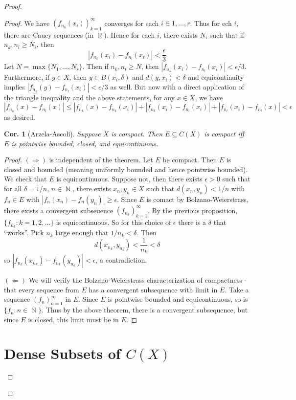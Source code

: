 \documentclass[12pt, a4paper]{book}
\DeclareMathOperator{\N}{\mathbb{N}}
\DeclareMathOperator{\R}{\mathbb{R}}
\newtheorem{corollary}[theorem]{Cor.}
\theoremstyle{nonumberplain}
\newtheorem{proof}{Proof}
\begin{document}
\begin{proof}
\begin{proof}
    We have $(f_{n_k}(x_i))_{k=1}^\infty$ converges for each $i\in 1,\ldots,r$.
    Thus for ech $i$, there are Caucy sequences (in $\R$).
    Hence for each $i$, there exists $N_i$ such that if $n_k,n_l\geq N_i$, then
    \[|f_{n_k}(x_i)-f_{n_l}(x_i)|<\frac{\epsilon}{3}\]
    Let $N=\max\{N_1,\ldots,N_r\}$.
    Then if $n_k,n_l\geq N$, then $|f_{n_k}(x_i)-f_{n_l}(x_i)|<\epsilon/3$.
    Furthermore, if $y\in X$, then $y\in B(x_i,\delta)$ and $d(y,x_i)<\delta$ and equicontinuity implies $|f_{n_k}(y)-f_{n_l}(x_i)|<\epsilon/3$ as well.
    But now with a direct application of the triangle inequality and the above statements, for any $x\in X$, we have
    \[|f_{n_k}(x)-f_{n_l}(x)|\leq |f_{n_k}(x)-f_{n_k}(x_i)|+|f_{n_k}(x_i)-f_{n_l}(x_i)|+|f_{n_l}(x_i)-f_{n_l}(x)|<\epsilon\]
    as desired.
\begin{corollary}[Arzela-Ascoli]
    Suppose $X$ is compact.
    Then $E\subseteq C(X)$ is compact iff $E$ is pointwise bounded, closed, and equicontinuous.
\end{corollary}
\begin{proof}
    $(\Rightarrow)$ is independent of the theorem.
    Let $E$ be compact.
    Then $E$ is closed and bounded (meaning uniformly bounded and hence pointwise bounded).
    We check that $E$ is equicontinuous.
    Suppose not, then there exists $\epsilon>0$ such that for all $\delta=1/n$, $n\in\N$, there exists $x_n,y_n\in X$ such that $d(x_n,y_n)<1/n$ with $f_n\in E$ with $|f_n(x_n)-f_n(y_n)|\geq\epsilon$.
    Since $E$ is comact by Bolzano-Weierstrass, there exists a convergent subseuence $(f_{n_k})_{k=1}^\infty$.
    By the previous proposition, $\{f_{n_k}:k=1,2,\ldots\}$ is equicontinuous.
    So for this choice of $\epsilon$ there is a $\delta$ that ``works''. Pick $n_k$ large enough that $1/n_k<\delta$. Then
    \[d(x_{n_k},y_{n_k})<\frac{1}{n_k}<\delta\]
    so $|f_{n_k}(x_{n_k})-f_{n_k}(y_{n_k})|<\epsilon$, a contradiction.

    $(\Leftarrow)$ We will verify the Bolzano-Weierstrass characterization of compactness - that every sequence from $E$ has a convergent subsequence with limit in $E$.
    Take a sequence $(f_n)_{n=1}^\infty$ in $E$.
    Since $E$ is pointwise bounded and equicontinuous, so is $\{f_n:n\in\N\}$.
    Thus by the above theorem, there is a convergent subsequence, but since $E$ is closed, this limit must be in $E$.
\end{proof}
\section{Dense Subsets of $C(X)$}

\end{proof}
\end{proof}
\end{document}

